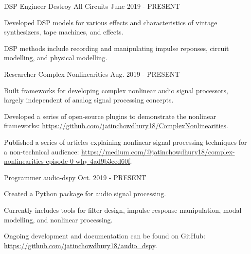 \begin{cventries}
    \cventry
    {DSP Engineer} %
    {Destroy All Circuits} %
    {} %
    {June 2019 - PRESENT} %
    {
      \begin{cvitems} %
        \item {Developed DSP models for various effects and characteristics of vintage synthesizers, tape machines, and effects.}
        \item {DSP methods include recording and manipulating impulse reponses, circuit modelling, and physical modelling.}
      \end{cvitems}
    }

    \cventry
    {Researcher} %
    {Complex Nonlinearities} %
    {} %
    {Aug. 2019 - PRESENT} %
    {
      \begin{cvitems} %
        \item {Built frameworks for developing complex nonlinear audio signal
               processors, largely independent of analog signal processing concepts.}
        \item {Developed a series of open-source plugins to demonstrate the nonlinear frameworks:
              \url{https://github.com/jatinchowdhury18/ComplexNonlinearities}.}
        \item {Published a series of articles explaining nonlinear signal
               processing techniques for a non-technical audience:
               \url{https://medium.com/@jatinchowdhury18/complex-nonlinearities-episode-0-why-4ad9b3eed60f}.}
      \end{cvitems}
    }

    \cventry
    {Programmer} %
    {audio-dspy} %
    {} %
    {Oct. 2019 - PRESENT} %
    {
      \begin{cvitems} %
        \item {Created a Python package for audio signal processing.}
        \item {Currently includes tools for filter design, impulse response manipulation, modal modelling, and nonlinear processing.}
        \item {Ongoing development and documentation can be found on GitHub: \url{https://github.com/jatinchowdhury18/audio_dspy}.}
      \end{cvitems}
    }


\end{cventries}
